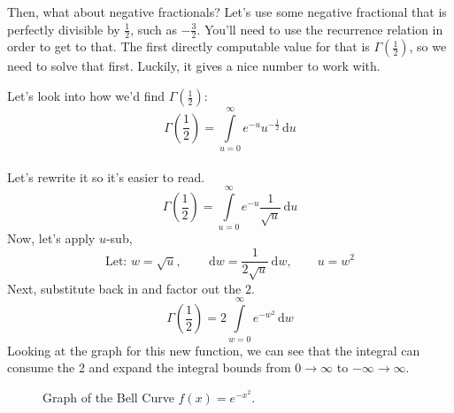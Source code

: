 \documentclass{article}
\newcommand{\du}{\, \mathrm{d}u}
\newcommand{\dw}{\, \mathrm{d}w}
\let\oldint\int
\renewcommand{\int}{\oldint\limits}
\begin{document}
	Then, what about negative fractionals? Let's use some negative fractional that is perfectly divisible by $\frac{1}{2}$, such as $-\frac{3}{2}$. You'll need to use the recurrence relation in order to get to that. The first directly computable value for that is $\Gamma(\frac{1}{2})$, so we need to solve that first. Luckily, it gives a nice number to work with.
	
	\newpage
	Let's look into how we'd find $\Gamma\left(\frac{1}{2}\right)$: \\[10pt]
	\[
	\displaystyle{\Gamma\left(\frac{1}{2}\right) = \int_{u=0}^{\infty} e^{-u}u^{-\frac{1}{2}}\du}
	\] \\ [5pt]
	\noindent Let's rewrite it so it's easier to read.
	\[\Gamma\left(\frac{1}{2}\right) = \int_{u=0}^{\infty} e^{-u} \frac{1}{\sqrt{u}}\du\]
	\noindent Now, let's apply $u$-sub,
	\[
	\text{Let: } w = \sqrt{u}, \qquad \dw = \frac{1}{2\sqrt{u}}\dw, \qquad u = w^2
	\]
	\noindent Next, substitute back in and factor out the $2$.
	\[
	\Gamma\left(\frac{1}{2}\right) = 2 \int_{w=0}^{\infty} e^{-w^2} \dw
	\]
	\noindent Looking at the graph for this new function, we can see that the integral can consume the 2 and expand the integral bounds from $0 \rightarrow \infty$ to $-\infty \rightarrow \infty$.
	\begin{figure}[!hbtp]
		\centering
		\caption{Graph of the Bell Curve $f(x)=e^{-x^2}$.}
	\end{figure}
	
\end{document}
